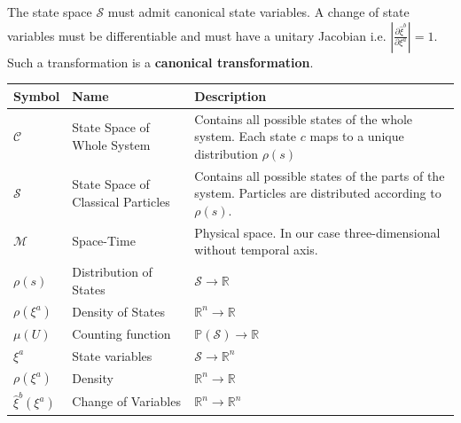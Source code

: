 \documentclass{article}[a4paper]
\begin{document}
	
\begin{prop}
	The state space $\mathcal{S}$ must admit canonical state variables. A change of state variables must be differentiable and must have a unitary Jacobian i.e. $\left|\frac{\partial\hat{\xi}^b}{\partial\xi^a}\right| = 1$. Such a transformation is a \textbf{canonical transformation}.
\end{prop}

\begin{center}
\renewcommand{\arraystretch}{1.6}
 \begin{tabular}{p{} p{} p{}}
 \hline
 Symbol & Name & Description \\ [0.5ex] 
 \hline\hline
 $\mathcal{C}$ & State Space of Whole System & Contains all possible states of the whole system. Each state $c$ maps to a unique distribution $\rho(s)$\\ [2ex]
 \hline
 $\mathcal{S}$ & State Space of Classical Particles & Contains all possible states of the parts of the system. Particles are distributed according to $\rho(s)$. \\ [2ex]
 \hline
 $\mathcal{M}$ & Space-Time & Physical space. In our case three-dimensional without temporal axis. \\ [2ex] 
 \hline
 $\rho(s)$ & Distribution of States & $\mathcal{S} \to \mathbb{R}$ \\
 \hline
 $\rho(\xi^a)$ & Density of States & $\mathbb{R}^n \to \mathbb{R}$ \\
 \hline
 $\mu(U)$ & Counting function & $\mathbb{P}(\mathcal{S}) \to \mathbb{R}$ \\
 \hline
 $\xi^a$ & State variables & $\mathcal{S} \to \mathbb{R}^n$ \\
 \hline
 $\rho(\xi^a)$ & Density & $\mathbb{R}^n \to \mathbb{R}$ \\
 \hline
 $\hat{\xi}^b(\xi^a)$ & Change of Variables & $\mathbb{R}^n \to \mathbb{R}^n$ \\ [1ex] 
 \hline
\end{tabular}
\end{center}
\end{document}
